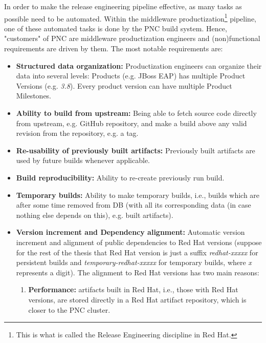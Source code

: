 \documentclass[../main.tex]{subfiles}
\begin{document}
In order to make the release engineering pipeline effective, as many tasks as possible need to be automated. Within the middleware productization\footnote{This is what is called the Release Engineering discipline in Red Hat.} pipeline, one of these automated tasks is done by the PNC build system. Hence, "customers" of PNC are middleware productization engineers and (non)functional requirements are driven by them. The most notable requirements are:

\begin{itemize}
  \item \textbf{Structured data organization:} Productization engineers can
organize their data into several levels: Products (e.g. JBoss EAP) has multiple Product Versions (e.g. \textit{3.8}). Every product version can have multiple Product Milestones.

  \item \textbf{Ability to build from upstream:} Being able to fetch source code directly from upstream, e.g. GitHub repository, and make a build above any valid revision from the repository, e.g. a tag.

  \item \textbf{Re-usability of previously built artifacts:} Previously built artifacts are used by future builds whenever applicable.

  \item \textbf{Build reproducibility:} Ability to re-create previously run build.

  \item \textbf{Temporary builds:} Ability to make temporary builds, i.e., builds which are after some time removed from DB (with all its corresponding data (in case nothing else depends on this), e.g. built artifacts).

  \item \textbf{Version increment and Dependency alignment:} Automatic version increment and alignment of public dependencies to Red Hat versions (suppose for the rest of the thesis that Red Hat version is just a suffix \textit{redhat-xxxxx} for persistent builds and \textit{temporary-redhat-xxxxx} for temporary builds, where \textit{x} represents a digit). The alignment to Red Hat versions has two main reasons:
  \begin{enumerate}
      \item \textbf{Performance:} artifacts built in Red Hat, i.e., those with Red Hat versions, are stored directly in a Red Hat artifact repository, which is closer to the PNC cluster.


\end{enumerate}
\end{itemize}
\end{document}
